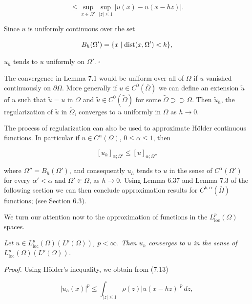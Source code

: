 \[
\le \sup_{x\in\Omega'}\sup_{|z|\le 1}\lvert u(x)-u(x-hz)\rvert.
\]

Since $u$ is uniformly continuous over the set

\[
B_h(\Omega')=\{x \mid \operatorname{dist}(x,\Omega')<h\},
\]

$u_h$ tends to $u$ uniformly on $\Omega'$. $\square$

The convergence in Lemma 7.1 would be uniform over all of $\Omega$ if $u$ vanished continuously on $\partial\Omega$. More generally if $u\in C^0(\overline{\Omega})$ we can define an extension $\tilde u$ of $u$ such that $\tilde u=u$ in $\Omega$ and $\tilde u\in C^0(\tilde\Omega)$ for some $\tilde\Omega \supset\supset \Omega$. Then $\tilde u_h$, the regularization of $\tilde u$ in $\tilde\Omega$, converges to $u$ uniformly in $\Omega$ as $h\to 0$.

The process of regularization can also be used to approximate Hölder continuous functions. In particular if $u\in C^{\alpha}(\Omega)$, $0\le \alpha\le 1$, then

\begin{equation}
\tag{7.14}
[u_h]_{\alpha;\Omega'}\le [u]_{\alpha;\Omega''}
\end{equation}

where $\Omega''=B_h(\Omega')$, and consequently $u_h$ tends to $u$ in the sense of $C^{\alpha}(\Omega')$ for every $\alpha'<\alpha$ and $\Omega' \Subset \Omega$, as $h\to 0$. Using Lemma 6.37 and Lemma 7.3 of the following section we can then conclude approximation results for $C^{k,\alpha}(\overline{\Omega})$ functions; (see Section 6.3).

We turn our attention now to the approximation of functions in the $L^p_{\mathrm{loc}}(\Omega)$ spaces.

\begin{lemma}\label{gt:lem-sobolev-regularization-lp}
\textit{Let $u\in L^p_{\mathrm{loc}}(\Omega)(L^p(\Omega))$, $p<\infty$. Then $u_h$ converges to $u$ in the sense of $L^p_{\mathrm{loc}}(\Omega)(L^p(\Omega))$.}
\end{lemma}

\textit{Proof.} Using Hölder's inequality, we obtain from (7.13)

\[
\lvert u_h(x)\rvert^p\le \int_{|z|\le 1}\rho(z)\lvert u(x-hz)\rvert^p\,dz,
\]



